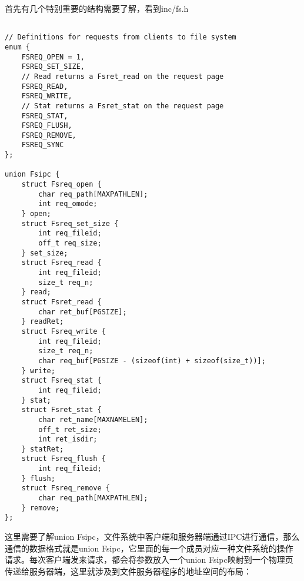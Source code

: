 \documentclass{article}
\begin{document}
\begin{CJK*}{UTF8}{gkai}
首先有几个特别重要的结构需要了解，看到inc/fs.h

\begin{lstlisting}[style=ccode, firstnumber=61, title={\scriptsize \ttfamily \bfseries inc/fs.h}]

// Definitions for requests from clients to file system
enum {
	FSREQ_OPEN = 1,
	FSREQ_SET_SIZE,
	// Read returns a Fsret_read on the request page
	FSREQ_READ,
	FSREQ_WRITE,
	// Stat returns a Fsret_stat on the request page
	FSREQ_STAT,
	FSREQ_FLUSH,
	FSREQ_REMOVE,
	FSREQ_SYNC
};

union Fsipc {
	struct Fsreq_open {
		char req_path[MAXPATHLEN];
		int req_omode;
	} open;
	struct Fsreq_set_size {
		int req_fileid;
		off_t req_size;
	} set_size;
	struct Fsreq_read {
		int req_fileid;
		size_t req_n;
	} read;
	struct Fsret_read {
		char ret_buf[PGSIZE];
	} readRet;
	struct Fsreq_write {
		int req_fileid;
		size_t req_n;
		char req_buf[PGSIZE - (sizeof(int) + sizeof(size_t))];
	} write;
	struct Fsreq_stat {
		int req_fileid;
	} stat;
	struct Fsret_stat {
		char ret_name[MAXNAMELEN];
		off_t ret_size;
		int ret_isdir;
	} statRet;
	struct Fsreq_flush {
		int req_fileid;
	} flush;
	struct Fsreq_remove {
		char req_path[MAXPATHLEN];
	} remove;
};
\end{lstlisting}

这里需要了解union Fsipc，文件系统中客户端和服务器端通过IPC进行通信，那么通信的数据格式就是union Fsipc，它里面的每一个成员对应一种文件系统的操作请求。每次客户端发来请求，都会将参数放入一个union Fsipc映射到一个物理页传递给服务器端，这里就涉及到文件服务器程序的地址空间的布局：


\end{CJK*}
\end{document}
